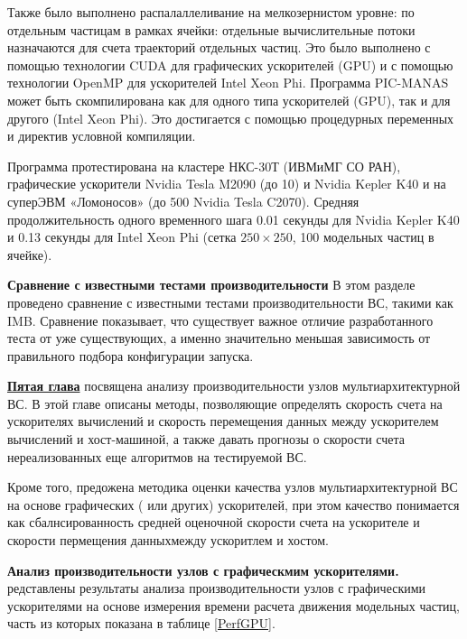 Также было выполнено распалаллеливание на мелкозернистом уровне: по отдельным частицам в рамках ячейки: отдельные вычислительные потоки назначаются для счета траекторий отдельных частиц. Это было выполнено с помощью технологии CUDA для графических ускорителей (GPU) и с помощью технологии OpenMP для ускорителей Intel Xeon Phi. Программа PIC-MANAS может быть скомпилирована как для одного типа ускорителей (GPU), так и для другого (Intel Xeon Phi). Это достигается с помощью процедурных переменных и директив условной компиляции. 

Программа протестирована на кластере НКС-30Т (ИВМиМГ СО РАН), графические ускорители Nvidia Tesla M2090 (до 10) и Nvidia Kepler K40 и на суперЭВМ «Ломоносов»  (до 500 Nvidia Tesla C2070). Средняя продолжительность одного временного шага 0.01 секунды для  Nvidia Kepler K40 и 0.13 секунды для  Intel Xeon Phi (сетка $250\times250$, 100 модельных частиц в ячейке).



\textbf{Сравнение с известными тестами производительности}
В этом разделе проведено сравнение с известными тестами производительности ВС, такими как IMB. Сравнение показывает, что существует важное отличие разработанного теста от уже существующих, а именно значительно меньшая зависимость от правильного подбора конфигурации запуска.  

\underline{\textbf{Пятая глава}} посвящена 
анализу производительности узлов мультиархитектурной ВС.
В этой главе описаны методы, позволяющие определять скорость счета на ускорителях вычислений и скорость перемещения данных между ускорителем вычислений и хост-машиной, а также давать прогнозы о скорости счета нереализованных еще алгоритмов на тестируемой ВС.

Кроме того, предожена методика оценки качества узлов мультиархитектурной ВС на основе графических ( или других) ускорителей, при этом качество понимается как сбалнсированность средней оценочной скорости счета на ускорителе и скорости пермещения данныхмежду ускоритлем и хостом. 

\textbf{Анализ производительности узлов с графическмим ускорителями.}
редставлены результаты анализа производительности узлов с графическими ускорителями на основе измерения времени расчета движения модельных частиц, часть из которых показана в таблице \ref{PerfGPU}.

